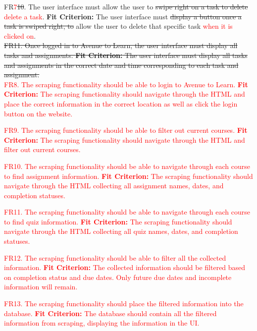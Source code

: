 \documentclass[12pt, titlepage]{article}
\begin{document}
\noindent FR\textcolor{red}{7}\sout{10}. The user interface must allow the user to \sout{swipe right on a task to delete} \textcolor{red}{delete a task}.
	\textbf{Fit Criterion:} The user interface must \sout{display a button once a task is swiped right, to} 
allow the user to delete that specific task \textcolor{red}{when it is clicked on}.\\

\noindent \sout{FR11. Once logged in to Avenue to Learn, the user interface must display all tasks and assignments.
	\textbf{Fit Criterion:} The user interface must display all tasks and assignments in the correct 
date and time corresponding to each task and assignment.}\\


\noindent \textcolor{red}{FR8. The scraping functionality should be able to login to Avenue to Learn.
	\textbf{Fit Criterion:} The scraping functionality should navigate through the HTML and place 
the correct information in the correct location as well as click the login button on the 
website.\\}

\noindent \textcolor{red}{FR9. The scraping functionality should be able to filter out current courses.
	\textbf{Fit Criterion:} The scraping functionality should navigate through the HTML and filter 
out current courses.\\}

\noindent \textcolor{red}{FR10. The scraping functionality should be able to navigate through each course to find assignment information.
	\textbf{Fit Criterion:} The scraping functionality should navigate through the HTML collecting 
all assignment names, dates, and completion statuses.\\}

\noindent \textcolor{red}{FR11. The scraping functionality should be able to navigate through each course to find quiz information.
	\textbf{Fit Criterion:} The scraping functionality should navigate through the HTML collecting 
all quiz names, dates, and completion statuses.\\}

\noindent \textcolor{red}{FR12. The scraping functionality should be able to filter all the collected information.
	\textbf{Fit Criterion:} The collected information should be filtered based on completion status 
and due dates. Only future due dates and incomplete information will remain.\\}

\noindent \textcolor{red}{FR13. The scraping functionality should place the filtered information into the database.
	\textbf{Fit Criterion:} The database should contain all the filtered information from scraping, 
displaying the information in the UI.\\}
\end{document}
